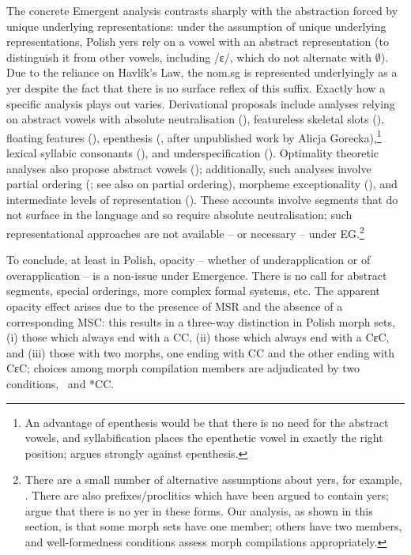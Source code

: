 The concrete Emergent analysis contrasts sharply with the abstraction forced by unique underlying representations: under the assumption of unique underlying representations, Polish  yers   rely on a vowel with an abstract representation  (to distinguish it from other vowels, including /ɛ/, which do not alternate with $\emptyset$). Due to the reliance on Havlík's Law,  the {\sc nom.sg} is represented underlyingly as a yer despite the fact that there is no surface reflex of this suffix. Exactly how a specific analysis plays out varies. Derivational proposals include analyses relying on abstract vowels with absolute neutralisation  (\citealt{Gussmann:1980, Rubach:1984}), featureless skeletal slots (\citealt{Spencer:1986}), floating features (\citealt{Rubach:1986, Kenstowicz+:1987}),  epenthesis (\citealt{Czaykowska-Higgins:1988}, after unpublished work by Alicja Gorecka),\footnote{An advantage of epenthesis would be that there is no need for the abstract vowels, and syllabification places the epenthetic vowel in exactly the right position; \citet{Szpyra:1992} argues strongly against epenthesis.} lexical syllabic consonants (\citealt{Piotrowski+:1992}), and  underspecification (\citealt{Szpyra:1992}). Optimality theoretic analyses also propose abstract vowels (\citealt{Yearley:1995}); additionally, such analyses involve partial ordering (\citealt{Jarosz:2005_CLS}; see also \citealt{Anttila:1997, Anttila:2002} on partial ordering), morpheme exceptionality (\citealt{Gouskova:2012}), and intermediate levels of representation (\citealt{Iwan:2015}). These accounts involve segments that do not surface in the language and so require absolute neutralisation; such representational approaches are not available -- or necessary -- under EG.\footnote{There are a small number of alternative assumptions about  yers, for example, \citet{Jarosz:2005_CLS, Gouskova:2012}. There are also prefixes/proclitics which have been argued to contain  yers;  \citet{Pajak+:2010} argue that there is no yer in these forms. Our analysis, as shown in this section, is that some morph sets have one member; others have two members, and well-formedness conditions assess morph compilations appropriately.}


To conclude, at least in Polish, opacity -- whether of underapplication or of overapplication -- is a non-issue under Emergence. There is no call for abstract segments, special orderings, more complex formal systems, etc. The  apparent opacity effect arises due to the presence of MSR and the absence of a corresponding MSC: this results in a three-way distinction in Polish morph sets, (i) those which always end with a CC, (ii) those which always end with a CɛC, and (iii) those with two morphs, one ending with CC and the other ending with CɛC; choices among morph compilation members are adjudicated by two conditions, \PolVC\ and *CC. 


